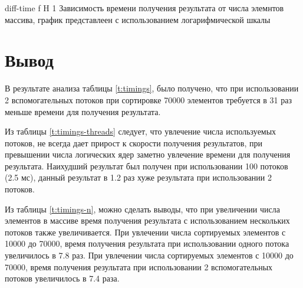 {diff-time} %
{f} %
{H} %
{1\textwidth} %
{Зависимость времени получения результата от числа элемнтов массива, график представлеен с использованием логарифмической шкалы} %


\section*{Вывод}
В результате анализа таблицы \ref{t:timings}, было получено, что при использовании 2 вспомогательных потоков при сортировке 70000 элементов требуется в 31 раз меньше времени для получения результата. 

Из таблицы  \ref{t:timings-threads}  следует, что увлечение числа используемых потоков, не всегда дает прирост к скорости получения результатов, при превышении числа логических ядер заметно увлечение времени для получения результата. Наихудший результат был получен при использовании 100 потоков (2.5 мс), данный результат в 1.2 раз хуже результата при использовании 2 потоков.

Из таблицы \ref{t:timings-n}, можно сделать выводы, что при увеличении числа элементов в массиве
время получения результата с использованием нескольких потоков также увеличивается. При увлечении числа сортируемых элементов с 10000 до 70000, время получения результата при использовании одного потока  увеличилось в 7.8 раз.
При увлечении числа сортируемых элементов с 10000 до 70000, время получения результата при использовании 2 вспомогательных потоков увеличилось в 7.4 раза.


